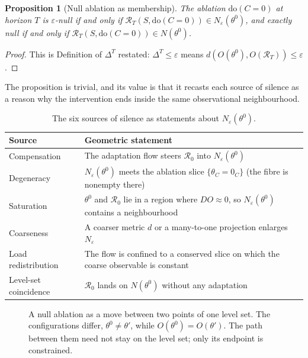 \documentclass[11pt]{article}
\newtheorem{proposition}[theorem]{Proposition}
\theoremstyle{definition}
\theoremstyle{remark}
\newcommand{\Rop}{\mathcal{R}}
\newcommand{\dox}[1]{\mathrm{do}(#1)}
\begin{document}
\begin{proposition}[Null ablation as membership]\label{prop:member}
The ablation $\dox{C=0}$ at horizon $T$ is $\varepsilon$-null if and only if $\Rop_T(S,\dox{C=0})\in N_\varepsilon(\theta^0)$, and exactly null if and only if $\Rop_T(S,\dox{C=0})\in N(\theta^0)$.
\end{proposition}
\begin{proof}
This is Definition of $\Delta^T$ restated: $\Delta^T\le\varepsilon$ means $d(O(\theta^0),O(\Rop_T))\le\varepsilon$.
\end{proof}

The proposition is trivial, and its value is that it recasts each source of silence as a reason why the intervention ends inside the same observational neighbourhood.

\begin{table}[h]
\centering
\small
\begin{tabular}{p{2.8cm}p{9.2cm}}
\toprule
Source & Geometric statement\\
\midrule
Compensation & The adaptation flow steers $\Rop_0$ into $N_\varepsilon(\theta^0)$\\
Degeneracy & $N_\varepsilon(\theta^0)$ meets the ablation slice $\{\theta_C=0_C\}$ (the fibre is nonempty there)\\
Saturation & $\theta^0$ and $\Rop_0$ lie in a region where $DO\approx0$, so $N_\varepsilon(\theta^0)$ contains a neighbourhood\\
Coarseness & A coarser metric $d$ or a many-to-one projection enlarges $N_\varepsilon$\\
Load redistribution & The flow is confined to a conserved slice on which the coarse observable is constant\\
Level-set coincidence & $\Rop_0$ lands on $N(\theta^0)$ without any adaptation\\
\bottomrule
\end{tabular}
\caption{The six sources of silence as statements about $N_\varepsilon(\theta^0)$.}
\end{table}

\begin{figure}[ht]
\centering
{}
\caption{A null ablation as a move between two points of one level set. The configurations differ, $\theta^0\ne\theta'$, while $O(\theta^0)=O(\theta')$. The path between them need not stay on the level set; only its endpoint is constrained.}
\end{figure}
\end{document}
